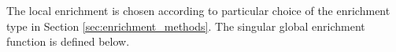 The local enrichment is chosen according to particular choice of the enrichment type in Section \ref{sec:enrichment_methods}.
The singular global enrichment function is defined below.

% 
% 
% 
